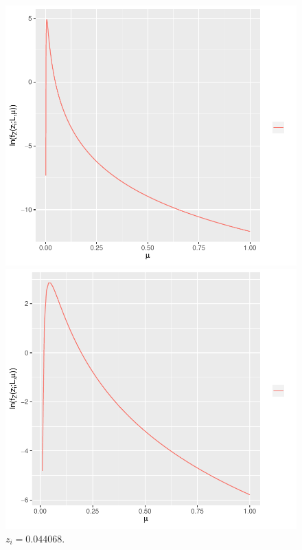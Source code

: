 \documentclass[journal,article,submit,moreauthors,pdftex]{Definitions/mdpi}
\begin{document}
\begin{figure}[hbt]
		\caption{$z_i=0.003186$.}\label{func_max_ver_L_4_z_20_flev_wishart}
\endminipage\hfill
\centering
\vspace{0.5cm}
  \includegraphics[width=\linewidth]{func_max_ver_L_4_z_30_flev_wishart.pdf}
  	\caption{$z_i=0.00582$.}\label{func_max_ver_L_4_z_30_flev_wishart}
\endminipage\hfill
{}
  \includegraphics[width=\linewidth]{func_max_ver_L_4_z_40_flev_wishart.pdf}
		\caption{$z_i=0.044068$.}\label{func_max_ver_L_4_z_40_flev_wishart}
\endminipage\hfill
\end{figure}
\end{document}
